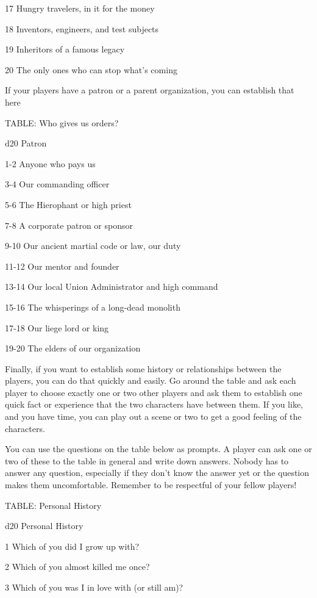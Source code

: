   17       Hungry travelers, in it for the money

  18       Inventors, engineers, and test subjects

  19       Inheritors of a famous legacy

  20       The only ones who can stop what’s coming

If your players have a patron or a parent organization, you can establish that here

TABLE: Who gives us orders?


 d20       Patron

 1-2       Anyone who pays us

 3-4       Our commanding officer

 5-6       The Hierophant or high priest

 7-8       A corporate patron or sponsor

 9-10      Our ancient martial code or law, our duty

 11-12     Our mentor and founder

 13-14     Our local Union Administrator and high command

 15-16     The whisperings of a long-dead monolith

 17-18     Our liege lord or king

 19-20     The elders of our organization

Finally, if you want to establish some history or relationships between the players, you can do
that quickly and easily. Go around the table and ask each player to choose exactly one or two
other players and ask them to establish one quick fact or experience that the two characters
have between them. If you like, and you have time, you can play out a scene or two to get a
good feeling of the characters.

You can use the questions on the table below as prompts. A player can ask one or two of these
to the table in general and write down answers. Nobody has to answer any question, especially if
they don’t know the answer yet or the question makes them uncomfortable. Remember to be
respectful of your fellow players!

TABLE: Personal History

 d20       Personal	History

 1         Which of you did I grow up with?

 2         Which of you almost killed me once?

 3         Which of you was I in love with (or still am)?

